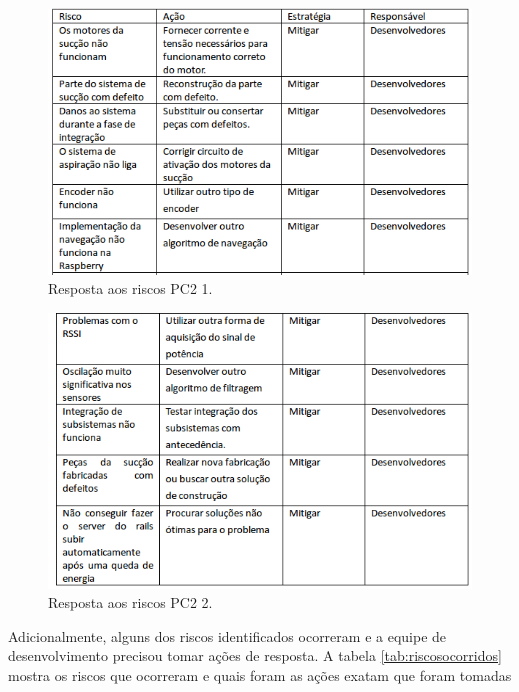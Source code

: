 \begin{figure}[H]
	\centering
	\includegraphics[scale=0.5]{figuras/riscos_acao_pc2_1.png}
	\caption{Resposta aos riscos PC2 1.}
	\label{img:respostasriscospc21}
\end{figure}

\begin{figure}[H]
	\centering
	\includegraphics[scale=0.5]{figuras/riscos_acao_pc2_2.png}
	\caption{Resposta aos riscos PC2 2.}
	\label{img:respostasriscospc22}
\end{figure}

Adicionalmente, alguns dos riscos identificados ocorreram e a equipe de desenvolvimento precisou tomar ações de resposta. A tabela \ref{tab:riscosocorridos} mostra os riscos que ocorreram e quais foram as ações exatam que foram tomadas

